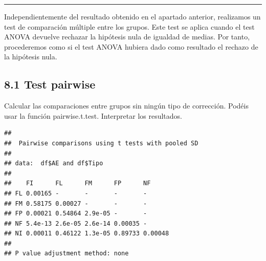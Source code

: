 \documentclass[
]{article}
\newenvironment{Shaded}{\begin{snugshade}}{\end{snugshade}}
\newcommand{\AttributeTok}[1]{\textcolor[rgb]{0.77,0.63,0.00}{#1}}
\newcommand{\FunctionTok}[1]{\textcolor[rgb]{0.00,0.00,0.00}{#1}}
\newcommand{\NormalTok}[1]{#1}
\newcommand{\SpecialCharTok}[1]{\textcolor[rgb]{0.00,0.00,0.00}{#1}}
\newcommand{\StringTok}[1]{\textcolor[rgb]{0.31,0.60,0.02}{#1}}
\begin{document}
\begin{center}\rule{0.5\linewidth}{0.5pt}\end{center}

\vspace{0.3cm}

Independientemente del resultado obtenido en el apartado anterior,
realizamos un test de comparación múltiple entre los grupos. Este test
se aplica cuando el test ANOVA devuelve rechazar la hipótesis nula de
igualdad de medias. Por tanto, procederemos como si el test ANOVA
hubiera dado como resultado el rechazo de la hipótesis nula.

\vspace{0.3cm}

\hypertarget{test-pairwise}{%
\subsection{8.1 Test pairwise}\label{test-pairwise}}

Calcular las comparaciones entre grupos sin ningún tipo de corrección.
Podéis usar la función pairwise.t.test. Interpretar los resultados.

\vspace{0.3cm}

\begin{Shaded}
\end{Shaded}

\begin{verbatim}
## 
##  Pairwise comparisons using t tests with pooled SD 
## 
## data:  df$AE and df$Tipo 
## 
##    FI      FL      FM      FP      NF     
## FL 0.00165 -       -       -       -      
## FM 0.58175 0.00027 -       -       -      
## FP 0.00021 0.54864 2.9e-05 -       -      
## NF 5.4e-13 2.6e-05 2.6e-14 0.00035 -      
## NI 0.00011 0.46122 1.3e-05 0.89733 0.00048
## 
## P value adjustment method: none
\end{verbatim}

\vspace{0.3cm}
\end{document}
